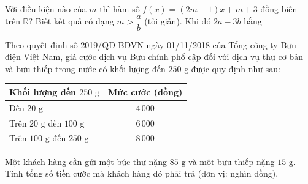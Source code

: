 



\begin{bt}%
	 Với điều kiện nào của $m$ thì hàm số $f(x)=(2m-1)x+m+3$ đồng biến trên $\mathbb{R}$? Biết kết quả có dạng $m >\dfrac{a}{b}$ (tối giản). Khi đó $2a-3b$ bằng
\end{bt}

\begin{bt}%
	Theo quyết định số 2019/QĐ-BĐVN ngày 01/11/2018 của Tổng công ty Bưu điện Việt Nam, giá cước dịch vụ Bưu chính phổ cập đối với dịch vụ thư cơ bản và bưu thiếp trong nước có khối lượng đến $250\text{ g}$ được quy định như sau:
	\begin{center}
		\begin{tabular}{|l|c|}
			\hline
			Khối lượng đến $250\text{ g}$ & Mức cước (đồng) \\
			\hline
			Đến $20\text{ g}$ & $4\,000$ \\
			Trên $20\text{ g}$ đến $100\text{ g}$ & $6\,000$ \\
			Trên $100\text{ g}$ đến $250\text{ g}$ & $8\,000$ \\
			\hline
		\end{tabular}
	\end{center}
	Một khách hàng cần gửi một bức thư nặng $85\text{ g}$ và một bưu thiếp nặng $15\text{ g}$. Tính tổng số tiền cước mà khách hàng đó phải trả (đơn vị: nghìn đồng).
\end{bt}

